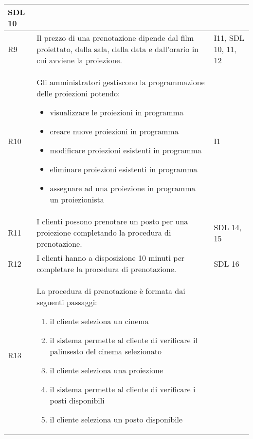 \begin{longtable}{|p{0.8cm}|p{13.4cm}|p{2.1cm}|}
      SDL 10
      \\\hline
      R9                                                                      &
      Il prezzo di una prenotazione dipende dal film proiettato, dalla
      sala, dalla data e dall'orario in cui avviene la proiezione.            &
      I11, SDL 10, 11, 12
      \\\hline
      R10                                                                     &
      Gli amministratori gestiscono la programmazione delle proiezioni
      potendo:
      \begin{itemize}
            \item visualizzare le proiezioni in programma
            \item creare nuove proiezioni in programma
            \item modificare proiezioni esistenti in programma
            \item eliminare proiezioni esistenti in programma
            \item assegnare ad una proiezione in programma un proiezionista
      \end{itemize}         &
      I1
      \\\hline
      R11                                                                     &
      I clienti possono prenotare un posto per una proiezione completando
      la procedura di prenotazione.                                           &
      SDL 14, 15
      \\\hline
      R12                                                                     &
      I clienti hanno a disposizione 10 minuti per completare la procedura
      di prenotazione.                                                        &
      SDL 16
      \\\hline
      R13                                                                     &
      La procedura di prenotazione è formata dai seguenti passaggi:
      \begin{enumerate}
            \item il cliente seleziona un cinema
            \item il sistema permette al cliente di verificare
                  il palinsesto del cinema selezionato
            \item il cliente seleziona una proiezione
            \item il sistema permette al cliente di verificare
                  i posti disponibili
            \item il cliente seleziona un posto disponibile

\end{enumerate}
\end{longtable}
